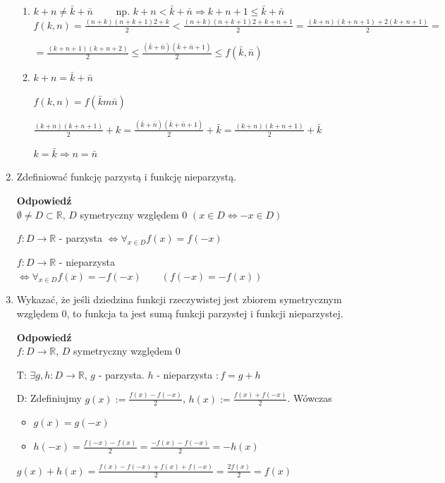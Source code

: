\documentclass[12pt,a4paper]{article}
\theoremstyle{break}
\newcommand{\Odp}[1]{
		\begin{mdframed}[style=zadanie]
			\textbf{Odpowiedź}\\
			#1
		\end{mdframed}
	}
\begin{document}
\begin{enumerate}[1.]
{		\begin{enumerate}[1$^\circ$]
			\item $k+n\neq \bar{k}+\bar{n} \qquad$ np. $k+n<\bar{k}+\bar{n} \Rightarrow k+n+1\leq \bar{k}+\bar{n}$\\
			
			$f(k,n)=\frac{{(n+k)(n+k+1)}{2}+k}{2}< \frac{{(n+k)(n+k+1)}{2}+k+n+1}{2} = \frac{(k+n)(k+n+1)+2(k+n+1)}{2}=$ 
			
			$=\frac{(k+n+1)(k+n+2)}{2}\leq \frac{(\bar{k}+\bar{n})(\bar{k}+\bar{n}+1)}{2}\leq f(\bar{k},\bar{n})$
			
			\item $k+n=\bar{k}+\bar{n}$
			
			$f(k,n)=f(\bar{k}m\bar{n})$
			
			$\frac{(k+n)(k+n+1)}{2}+k=\frac{(\bar{k}+\bar{n})(\bar{k}+\bar{n}+1)}{2}+\bar{k}=\frac{(k+n)(k+n+1)}{2}+\bar{k}$
			
			$k=\bar{k} \Rightarrow n=\bar{n}$
		\end{enumerate}
	}
	
	\item Zdeﬁniować funkcję parzystą i funkcję nieparzystą.
	\Odp{
		$\emptyset\neq D \subset \mathbb{R}$, $D$ symetryczny względem $0$ $(x\in D\Leftrightarrow -x\in D)$
		
		$f:D\rightarrow\mathbb{R}$ - parzysta $\Leftrightarrow \forall_{x\in D} f(x)=f(-x)$
		
		$f:D\rightarrow\mathbb{R}$ - nieparzysta $\Leftrightarrow \forall_{x\in D} f(x)=-f(-x) \qquad (f(-x)=-f(x))$
	}
	
	\item Wykazać, że jeśli dziedzina funkcji rzeczywistej jest zbiorem symetrycznym względem 0, to funkcja ta jest sumą funkcji parzystej i funkcji nieparzystej.
	\Odp{
		$f:D\rightarrow \mathbb{R}$, $D$ symetryczny względem $0$
		
		T: $\exists g,h : D\rightarrow \mathbb{R}$, $g$ - parzysta. $h$ - nieparzysta $: f=g+h$
		
		D: Zdefiniujmy $g(x):=\frac{f(x)-f(-x)}{2}$, $h(x):=\frac{f(x)+f(-x)}{2}$. Wówczas
		\begin{itemize}
			\item $g(x)=g(-x)$
			\item $h(-x)=\frac{f(-x)-f(x)}{2}=\frac{-f(x)-f(-x)}{2}=-h(x)$
		\end{itemize}
		
		$g(x)+h(x)=\frac{f(x)-f(-x)+f(x)+f(-x)}{2}=\frac{2f(x)}{2}=f(x)$  
	}
	

\end{enumerate}
\end{document}
